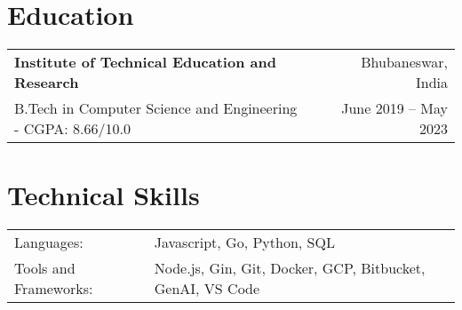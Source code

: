 \documentclass[a4paper,12pt]{article}
\begin{document}
\section{Education}
\begin{tabularx}{\linewidth}{@{}l X r@{}}
\textbf{Institute of Technical Education and Research} && Bhubaneswar, India  \\
B.Tech in Computer Science and Engineering - CGPA: 8.66/10.0 && June 2019 -- May 2023
\end{tabularx}

\section{Technical Skills}
\begin{tabularx}{\linewidth}{@{}l X@{}}
Languages: & Javascript, Go, Python, SQL \\
Tools and Frameworks: & Node.js, Gin, Git, Docker, GCP, Bitbucket, GenAI, VS Code \\
\end{tabularx}
\end{document}
